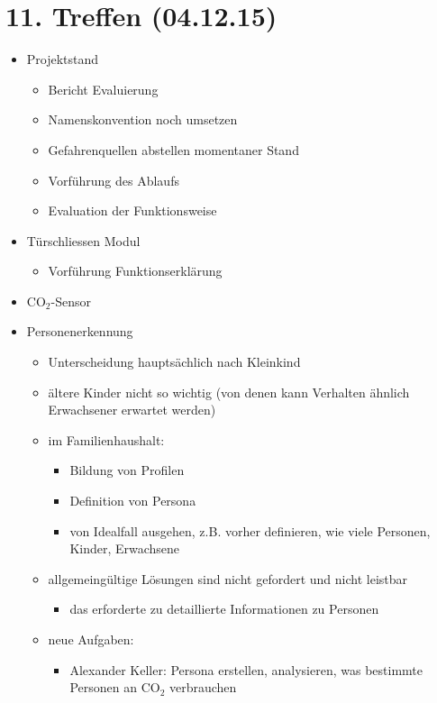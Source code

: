 \section{11. Treffen (04.12.15)}
\begin{itemize}
	\item Projektstand
	\begin{itemize}
		\item Bericht Evaluierung
		\item Namenskonvention noch umsetzen
		\item Gefahrenquellen abstellen momentaner Stand
		\item Vorführung des Ablaufs
		\item Evaluation der Funktionsweise
	\end{itemize}

	\item Türschliessen Modul
	\begin{itemize}
		\item Vorführung Funktionserklärung
	\end{itemize}

	\item CO$_2$-Sensor
	\item Personenerkennung
	\begin{itemize}
		\item Unterscheidung hauptsächlich nach Kleinkind
		\item ältere Kinder nicht so wichtig (von denen kann Verhalten ähnlich Erwachsener erwartet werden)
		\item im Familienhaushalt:
		\begin{itemize}
			\item Bildung von Profilen
			\item Definition von Persona
			\item von Idealfall ausgehen, z.B. vorher definieren, wie viele Personen, Kinder, Erwachsene
		\end{itemize}
	\item allgemeingültige Lösungen sind nicht gefordert und nicht leistbar
		\begin{itemize}
			\item das erforderte zu detaillierte Informationen zu Personen
		\end{itemize}
	\item neue Aufgaben:
		\begin{itemize}
			\item Alexander Keller: Persona erstellen, analysieren, was bestimmte Personen an CO$_2$ verbrauchen	
		\end{itemize}
	\end{itemize}


\end{itemize}
